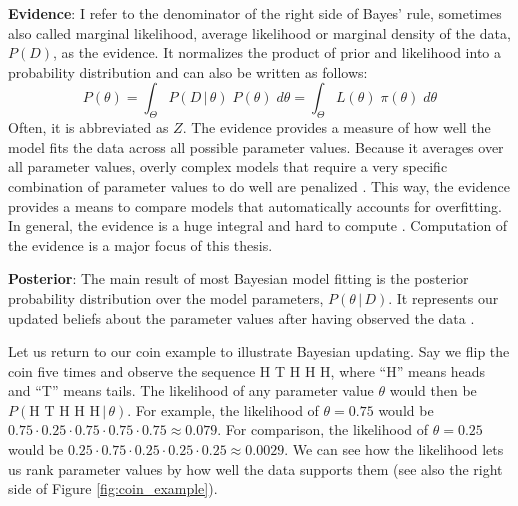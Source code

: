 \documentclass[12pt, a4paper]{report}
\begin{document}
\textbf{Evidence}: I refer to the denominator of the right side of Bayes' rule, sometimes also called marginal likelihood, average likelihood or marginal density of the data, $P(D)$, as the evidence.
It normalizes the product of prior and likelihood into a probability distribution and can also be written as follows: 
\begin{equation}
    P(\theta) = \int_\Theta P(D \,|\, \theta) \; P(\theta) \; d\theta = \int_\Theta L(\theta) \; \pi(\theta) \; d\theta
    \label{eq:evidence}
\end{equation}
Often, it is abbreviated as $Z$.
The evidence provides a measure of how well the model fits the data across all possible parameter values.
Because it averages over all parameter values, overly complex models that require a very specific combination of parameter values to do well are penalized \cite[221]{mcelreath}.
This way, the evidence provides a means to compare models that automatically accounts for overfitting. 
In general, the evidence is a huge integral and hard to compute \cite[221]{mcelreath}.
Computation of the evidence is a major focus of this thesis.

\textbf{Posterior}: The main result of most Bayesian model fitting is the posterior probability distribution over the model parameters, $P(\theta \,|\, D)$.
It represents our updated beliefs about the parameter values after having observed the data \cite[36]{mcelreath}.

Let us return to our coin example to illustrate Bayesian updating.
Say we flip the coin five times and observe the sequence H T H H H, where ``H'' means heads and ``T'' means tails.
The likelihood of any parameter value $\theta$ would then be $P(\textrm{H T H H H} \, | \, \theta)$.
For example, the likelihood of $\theta = 0.75$ would be $0.75 \cdot 0.25 \cdot 0.75 \cdot 0.75 \cdot 0.75 \approx 0.079$.
For comparison, the likelihood of $\theta = 0.25$ would be $0.25 \cdot 0.75 \cdot 0.25 \cdot 0.25 \cdot 0.25 \approx 0.0029$.
We can see how the likelihood lets us rank parameter values by how well the data supports them (see also the right side of Figure \ref{fig:coin_example}).
\end{document}
